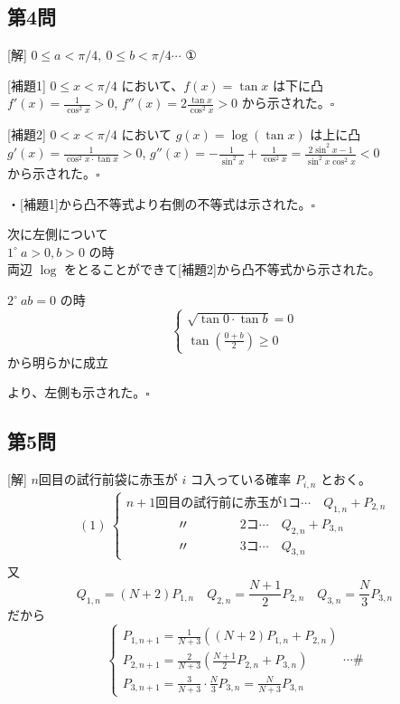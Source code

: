 \documentclass[../main.tex]{subfiles}
\begin{document}
\subsection*{第4問}
[解] $0 \le a < \pi/4, \ 0 \le b < \pi/4 \cdots$ ①

[補題1] $0 \le x < \pi/4$ において、$f(x) = \tan x$ は下に凸 \\
$f'(x) = \frac{1}{\cos^2 x} > 0$, $f''(x) = 2 \frac{\tan x}{\cos^2 x} > 0$ から示された。$\square$

[補題2] $0 < x < \pi/4$ において $g(x) = \log(\tan x)$ は上に凸 \\
$g'(x) = \frac{1}{\cos^2 x \cdot \tan x} > 0$, $g''(x) = - \frac{1}{\sin^2 x} + \frac{1}{\cos^2 x} = \frac{2\sin^2 x - 1}{\sin^2 x \cos^2 x} < 0$ \\
から示された。$\square$

・[補題1]から凸不等式より右側の不等式は示された。$\square$

次に左側について \\
$1^\circ \ a>0, b>0$ の時 \\
両辺 $\log$ をとることができて[補題2]から凸不等式から示された。

$2^\circ \ ab=0$ の時
\[
  \begin{cases}
    \sqrt{\tan 0 \cdot \tan b} = 0 \\
    \tan\left(\frac{0+b}{2}\right) \ge 0
  \end{cases}
\]
から明らかに成立

より、左側も示された。$\square$

\subsection*{第5問}
[解] $n$回目の試行前袋に赤玉が $i$ コ入っている確率 $P_{i,n}$ とおく。
\begin{align*}
  (1)\
  \begin{cases}
    n+1\text{回目の試行前に赤玉が1コ} \cdots \quad Q_{1,n} + P_{2,n} \\
    \qquad \qquad \text{〃} \qquad \qquad 2\text{コ} \cdots \quad Q_{2,n} + P_{3,n} \\
    \qquad \qquad \text{〃} \qquad \qquad 3\text{コ} \cdots \quad Q_{3,n}
  \end{cases}
\end{align*}
又
\[ Q_{1,n} = (N+2)P_{1,n} \quad Q_{2,n} = \frac{N+1}{2} P_{2,n} \quad Q_{3,n} = \frac{N}{3} P_{3,n} \]
だから
\[
  \begin{cases}
    P_{1,n+1} = \frac{1}{N+3} ( (N+2) P_{1,n} + P_{2,n} ) \\
    P_{2,n+1} = \frac{2}{N+3} ( \frac{N+1}{2} P_{2,n} + P_{3,n} ) \\
    P_{3,n+1} = \frac{3}{N+3} \cdot \frac{N}{3} P_{3,n} = \frac{N}{N+3} P_{3,n}
  \end{cases} \cdots \#
\]
\end{document}
